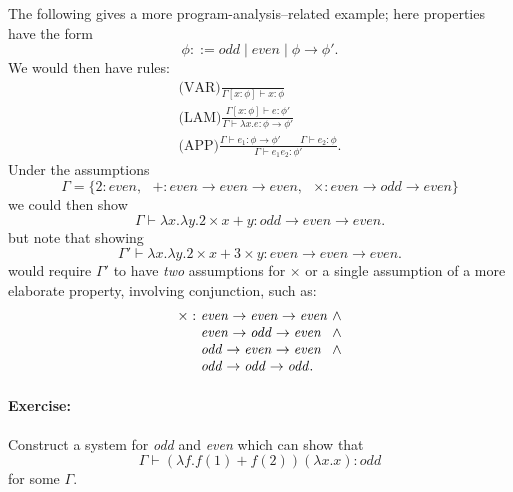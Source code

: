 \documentclass[twoside,a4paper,11pt]{article}
\begin{document}
The following gives a more program-analysis--related example;
here properties have the form
\[ \phi ::= \mathit{odd} \mid \mathit{even} \mid \phi \rightarrow \phi'. \]
We would then have rules:
\[ \begin{array}{c}
\displaystyle\mbox{(VAR)}\frac{}{\Gamma[x:\phi] \vdash x:\phi} \\[3ex]
\displaystyle\mbox{(LAM)}\frac{\Gamma[x:\phi] \vdash e:\phi'}
                     {\Gamma \vdash \lambda x.e:\phi\rightarrow \phi'} \\[3ex]
\displaystyle\mbox{(APP)}\frac{\Gamma \vdash e_1:\phi\rightarrow \phi'
                  \hspace{2em} \Gamma \vdash e_2:\phi}
                     {\Gamma \vdash e_1 e_2:\phi'}.
\end{array} \]
Under the assumptions
\[ \Gamma = \{2:\mathit{even},~~~
+:\mathit{even} \rightarrow \mathit{even} \rightarrow \mathit{even},~~~
\times:\mathit{even} \rightarrow \mathit{odd} \rightarrow \mathit{even}
 \} \]
we could then show
\[ \Gamma \vdash \lambda x.\lambda y. 2\times x+y:
    \mathit{odd} \rightarrow \mathit{even} \rightarrow \mathit{even}.
\]
but note that showing
\[ \Gamma' \vdash \lambda x.\lambda y. 2\times x+3\times y:
    \mathit{even} \rightarrow \mathit{even} \rightarrow \mathit{even}.
\]
would require $\Gamma'$ to have {\em two} assumptions for $\times$
or a single assumption of a
more elaborate property, involving conjunction, such as:
\[
\begin{array}{r@{}l@{}l}
\times :~
&  \mathit{even} \rightarrow \mathit{even} \rightarrow \mathit{even} &~\wedge\\
&  \mathit{even} \rightarrow \mathit{odd} \rightarrow \mathit{even} &~\wedge\\
&  \mathit{odd} \rightarrow \mathit{even} \rightarrow \mathit{even} &~\wedge\\
&  \mathit{odd} \rightarrow \mathit{odd} \rightarrow \mathit{odd}.
\end{array} \]
\paragraph{Exercise:}
Construct a system for {\em odd} and {\em even} which can show that
\[ \Gamma \vdash (\lambda f.f(1)+f(2))(\lambda x.x) : \mathit{odd} \]
for some $\Gamma$.
\end{document}
